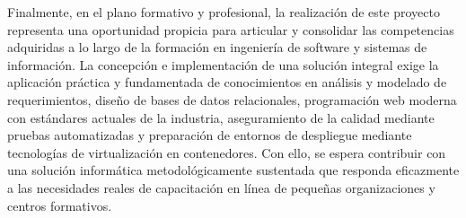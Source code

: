 Finalmente, en el plano formativo y profesional, la realización de este proyecto representa una oportunidad propicia para articular y consolidar las competencias adquiridas a lo largo de la formación en ingeniería de software y sistemas de información. La concepción e implementación de una solución integral exige la aplicación práctica y fundamentada de conocimientos en análisis y modelado de requerimientos, diseño de bases de datos relacionales, programación web moderna con estándares actuales de la industria, aseguramiento de la calidad mediante pruebas automatizadas y preparación de entornos de despliegue mediante tecnologías de virtualización en contenedores. Con ello, se espera contribuir con una solución informática metodológicamente sustentada que responda eficazmente a las necesidades reales de capacitación en línea de pequeñas organizaciones y centros formativos.

